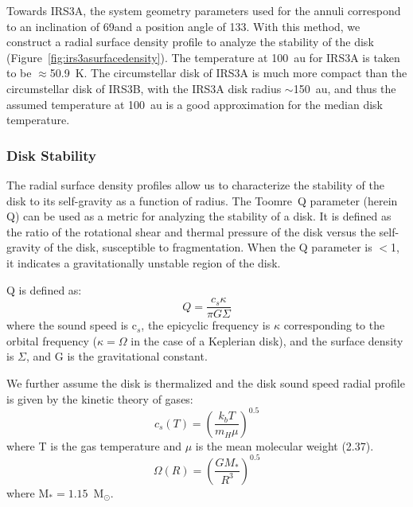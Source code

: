 \documentclass[twocolumn, 12pt]{aastex63}
\renewcommand{\deg}{\degr}
\newcommand{\ab}{$\sim$}
\newcommand{\solm}{M$_{\odot}$}
\begin{document}
Towards IRS3A, the system geometry parameters used for the annuli correspond to an inclination of 69\deg\space and a position angle of 133\deg. With this method, we construct a radial surface density profile to analyze the stability of the disk (Figure~\ref{fig:irs3asurfacedensity}). The temperature at 100~au for IRS3A is taken to be $\approx$50.9~K. The circumstellar disk of IRS3A is much more compact than the circumstellar disk of IRS3B, with the IRS3A disk radius \ab150~au, and thus the assumed temperature at 100~au is a good approximation for the median disk temperature.


\subsubsection{Disk Stability}\label{sec:stability}
The radial surface density profiles allow us to characterize the stability of the disk to its self-gravity as a function of radius. The Toomre~Q parameter (herein Q) can be used as a metric for analyzing the stability of a disk. It is defined as the ratio of the rotational shear and thermal pressure of the disk versus the self-gravity of the disk, susceptible to fragmentation. When the Q parameter is $<$1, it indicates a gravitationally unstable region of the disk. 

Q is defined as: 
\begin{equation}
Q = \frac{c_{s} \kappa}{\pi G \Sigma}
\end{equation}
where the sound speed is c$_s$, the epicyclic frequency is $\kappa$ corresponding to the orbital frequency ($\kappa = \Omega$ in the case of a Keplerian disk), and the surface density is $\Sigma$, and G is the gravitational constant.

We further assume the disk is thermalized and the disk sound speed radial profile is given by the kinetic theory of gases: 
\begin{equation}\label{eq:cs}
c_{s}\left(T\right) = \left(\frac{k_{b}T}{m_{H} \mu}\right) ^{0.5}
\end{equation}
where T is the gas temperature and $\mu$ is the mean molecular weight (2.37).  
\begin{equation}
\Omega\left(R\right) = \left(\frac{GM_{*}}{R^{3}}\right)^{0.5}
\end{equation}
 where M$_{*}=1.15$~\solm.
 
\end{document}
